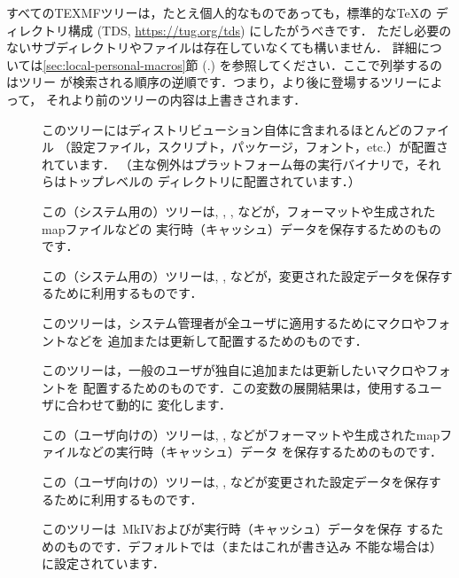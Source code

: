 \documentclass[uplatex,dvipdfmx,tombow]{jsarticle}
\begin{document}
すべてのTEXMFツリーは，たとえ個人的なものであっても，標準的な\TeX の
ディレクトリ構成 (TDS, \url{https://tug.org/tds}) にしたがうべきです．
ただし必要のないサブディレクトリやファイルは存在していなくても構いません．
詳細については\ref{sec:local-personal-macros}節 (\p.\pageref{%
sec:local-personal-macros}) を参照してください．ここで列挙するのはツリー
が検索される順序の逆順です．つまり，より後に登場するツリーによって，
それより前のツリーの内容は上書きされます．
%
\begin{description}
\item[]
このツリーには\TL ディストリビューション自体に含まれるほとんどのファイル
（設定ファイル，スクリプト，パッケージ，フォント，etc.）が配置されています．
（主な例外はプラットフォーム毎の実行バイナリで，それらはトップレベルの
ディレクトリに配置されています．）

\item[]
この（システム用の）ツリーは, , , などが，フォーマットや生成されたmapファイルなどの
実行時（キャッシュ）データを保存するためのものです．

\item[]
この（システム用の）ツリーは, , などが，変更された設定データを保存するために利用するものです．

\item[]
このツリーは，システム管理者が全ユーザに適用するためにマクロやフォントなどを
追加または更新して配置するためのものです．

\item[]
このツリーは，一般のユーザが独自に追加または更新したいマクロやフォントを
配置するためのものです．この変数の展開結果は，使用するユーザに合わせて動的に
変化します．

\item[]
この（ユーザ向けの）ツリーは, , などがフォーマットや生成されたmapファイルなどの実行時（キャッシュ）データ
を保存するためのものです．

\item[]
この（ユーザ向けの）ツリーは, , などが変更された設定データを保存するために利用するものです．

\item[]
このツリーは\ConTeXt\ MkIVおよび\LuaLaTeX が実行時（キャッシュ）データを保存
するためのものです．デフォルトでは（またはこれが書き込み
不能な場合は）に設定されています．
\end{description}
\end{document}
